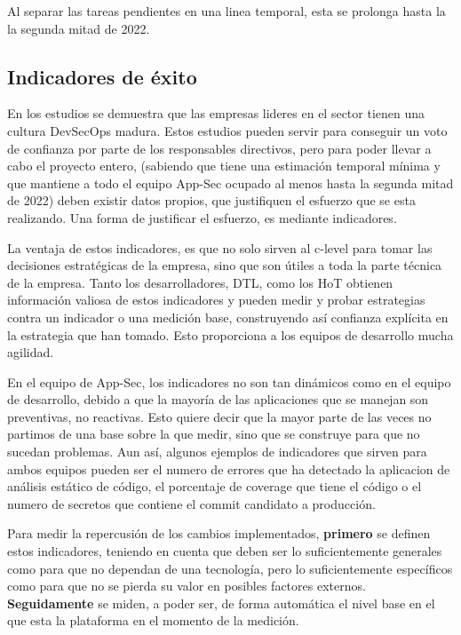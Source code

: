 \documentclass[12pt]{report} %
\begin{document}
Al separar las tareas pendientes en una linea temporal, esta se prolonga hasta la
la segunda mitad de 2022.


\subsection{Indicadores de éxito}

En los estudios se demuestra que las empresas lideres en el sector tienen una cultura
\gls{DevSecOps} madura. %
Estos estudios pueden servir para conseguir un voto de confianza por parte de los
responsables directivos, pero para poder llevar a cabo el proyecto entero,
(sabiendo que tiene una estimación temporal mínima y que mantiene a todo el equipo
\gls{App-Sec} ocupado al menos hasta la segunda mitad de 2022) deben existir
datos propios, que justifiquen el esfuerzo que se esta realizando.
Una forma de justificar el esfuerzo, es mediante indicadores.

La ventaja de estos indicadores, es que no solo sirven al \gls{c-level} para
tomar las decisiones estratégicas de la empresa, sino que son útiles a toda la
parte técnica de la empresa.
Tanto los desarrolladores, \gls{DTL}, como los \gls{HoT} obtienen
información valiosa de estos indicadores y pueden medir y probar estrategias
contra un indicador o una medición base, construyendo así confianza explícita en
la estrategia que han tomado.
Esto proporciona a los equipos de desarrollo mucha agilidad.

En el equipo de \gls{App-Sec}, los indicadores no son tan dinámicos como en el
equipo de desarrollo, debido a que la mayoría de las aplicaciones que se manejan
son preventivas, no reactivas.
Esto quiere decir que la mayor parte de las veces no partimos de una base sobre
la que medir, sino que se construye para que no sucedan problemas.
Aun así, algunos ejemplos de indicadores que sirven para ambos equipos pueden
ser el numero de errores que ha detectado la aplicacion de análisis estático de
código, el porcentaje de \gls{coverage} que tiene el código o el numero de
secretos que contiene el \gls{commit} candidato a producción.

Para medir la repercusión de los cambios implementados, \textbf{primero} se definen estos
indicadores, teniendo en cuenta que deben ser lo suficientemente generales como
para que no dependan de una tecnología, pero lo suficientemente específicos
como para que no se pierda su valor en posibles factores externos.
\textbf{Seguidamente} se miden, a poder ser, de forma automática el nivel base en el
que esta la plataforma en el momento de la medición.
\end{document}
